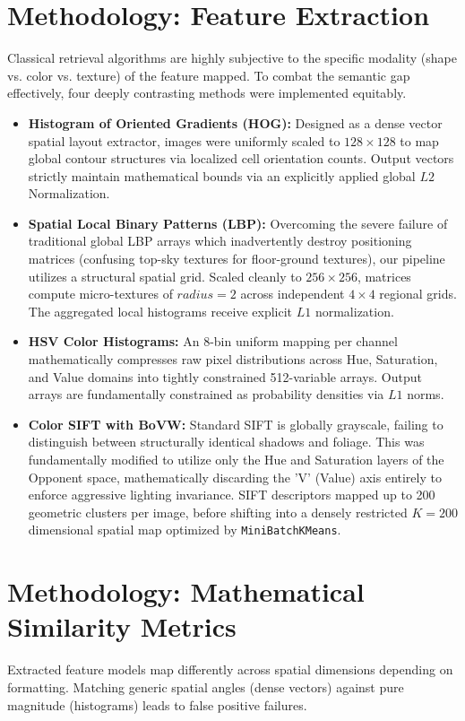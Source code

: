 \documentclass[11pt, a4paper]{article}
\begin{document}
\section{Methodology: Feature Extraction}
Classical retrieval algorithms are highly subjective to the specific modality (shape vs. color vs. texture) of the feature mapped. To combat the semantic gap effectively, four deeply contrasting methods were implemented equitably.

\begin{itemize}
    \item \textbf{Histogram of Oriented Gradients (HOG):} Designed as a dense vector spatial layout extractor, images were uniformly scaled to $128 \times 128$ to map global contour structures via localized cell orientation counts. Output vectors strictly maintain mathematical bounds via an explicitly applied global $L2$ Normalization.
    \item \textbf{Spatial Local Binary Patterns (LBP):} Overcoming the severe failure of traditional global LBP arrays which inadvertently destroy positioning matrices (confusing top-sky textures for floor-ground textures), our pipeline utilizes a structural spatial grid. Scaled cleanly to $256 \times 256$, matrices compute micro-textures of $radius=2$ across independent $4 \times 4$ regional grids. The aggregated local histograms receive explicit $L1$ normalization.
    \item \textbf{HSV Color Histograms:} An 8-bin uniform mapping per channel mathematically compresses raw pixel distributions across Hue, Saturation, and Value domains into tightly constrained 512-variable arrays. Output arrays are fundamentally constrained as probability densities via $L1$ norms.
    \item \textbf{Color SIFT with BoVW:} Standard SIFT is globally grayscale, failing to distinguish between structurally identical shadows and foliage. This was fundamentally modified to utilize only the Hue and Saturation layers of the Opponent space, mathematically discarding the 'V' (Value) axis entirely to enforce aggressive lighting invariance. SIFT descriptors mapped up to 200 geometric clusters per image, before shifting into a densely restricted $K=200$ dimensional spatial map optimized by \texttt{MiniBatchKMeans}.
\end{itemize}

\section{Methodology: Mathematical Similarity Metrics}
Extracted feature models map differently across spatial dimensions depending on formatting. Matching generic spatial angles (dense vectors) against pure magnitude (histograms) leads to false positive failures. 
\end{document}
